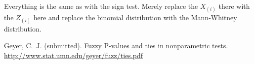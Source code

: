 \documentclass{article}
\begin{document}
Everything is the same as with the sign test.  Merely replace the $X_{(i)}$
there with the $Z_{(i)}$ here and replace the binomial distribution with
the Mann-Whitney distribution.

\begin{thebibliography}{}

Geyer, C.~J. (submitted).
\newblock  Fuzzy P-values and ties in nonparametric tests.
\newblock  \url{http://www.stat.umn.edu/geyer/fuzz/ties.pdf}

\end{thebibliography}
\end{document}
